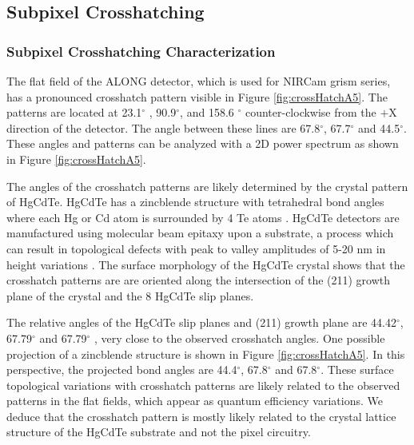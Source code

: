 \documentclass{aastex62}
\newcommand{\degree}{^\circ}
\begin{document}
\subsection{Subpixel Crosshatching}

\subsubsection{Subpixel Crosshatching Characterization}
The flat field of the ALONG detector, which is used for NIRCam grism series, has a pronounced crosshatch pattern visible in Figure \ref{fig:crossHatchA5}.
The patterns are located at 23.1$\degree$ , 90.9$\degree$, and 158.6 $\degree$ counter-clockwise from the $+$X direction of the detector.
The angle between these lines are 67.8$\degree$, 67.7$\degree$ and 44.5$\degree$.
These angles and patterns can be analyzed with a 2D power spectrum as shown in Figure \ref{fig:crossHatchA5}.

The angles of the crosshatch patterns are likely determined by the crystal pattern of HgCdTe.
HgCdTe has a zincblende structure with tetrahedral bond angles where each Hg or Cd atom is surrounded by 4 Te atoms \citep{gemain2012mercVacanciesHgCdTe}.
HgCdTe detectors are manufactured using molecular beam epitaxy upon a substrate, a process which can result in topological defects with peak to valley amplitudes of 5-20 nm in height variations \citep{chang2008surfaceMorphologyHgCdTe}.
The surface morphology of the HgCdTe crystal shows that the crosshatch patterns are are oriented along the intersection of the (211) growth plane of the crystal and the 8 HgCdTe slip planes.

The relative angles of the HgCdTe slip planes and (211) growth plane are 44.42$\degree$, 67.79$\degree$ and 67.79$\degree$ \citep{chang2008surfaceMorphologyHgCdTe}, very close to the observed crosshatch angles.
One possible projection of a zincblende structure is shown in Figure \ref{fig:crossHatchA5}.
In this perspective, the projected bond angles are 44.4$\degree$, 67.8$\degree$ and 67.8$\degree$.
These surface topological variations with crosshatch patterns are likely related to the observed patterns in the flat fields, which appear as quantum efficiency variations.
We deduce that the crosshatch pattern is mostly likely related to the crystal lattice structure of the HgCdTe substrate and not the pixel circuitry.
\end{document}
